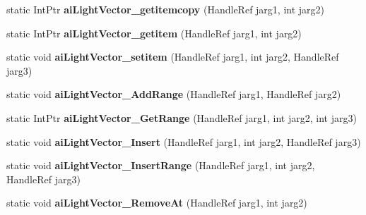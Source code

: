 \begin{DoxyCompactItemize}
\item 
\hypertarget{class_assimp_p_i_n_v_o_k_e_a712ce5cccd31b5d3c50c2599db1adf1e}{static Int\+Ptr {\bfseries ai\+Light\+Vector\+\_\+getitemcopy} (Handle\+Ref jarg1, int jarg2)}\label{class_assimp_p_i_n_v_o_k_e_a712ce5cccd31b5d3c50c2599db1adf1e}

\item 
\hypertarget{class_assimp_p_i_n_v_o_k_e_a07bbfd3e6caa5095f8828b1dbdc1b208}{static Int\+Ptr {\bfseries ai\+Light\+Vector\+\_\+getitem} (Handle\+Ref jarg1, int jarg2)}\label{class_assimp_p_i_n_v_o_k_e_a07bbfd3e6caa5095f8828b1dbdc1b208}

\item 
\hypertarget{class_assimp_p_i_n_v_o_k_e_a77287e956fca18e6c081a1ac3c7e6e4a}{static void {\bfseries ai\+Light\+Vector\+\_\+setitem} (Handle\+Ref jarg1, int jarg2, Handle\+Ref jarg3)}\label{class_assimp_p_i_n_v_o_k_e_a77287e956fca18e6c081a1ac3c7e6e4a}

\item 
\hypertarget{class_assimp_p_i_n_v_o_k_e_afe368bec4f049a3ecdf445e727af217b}{static void {\bfseries ai\+Light\+Vector\+\_\+\+Add\+Range} (Handle\+Ref jarg1, Handle\+Ref jarg2)}\label{class_assimp_p_i_n_v_o_k_e_afe368bec4f049a3ecdf445e727af217b}

\item 
\hypertarget{class_assimp_p_i_n_v_o_k_e_a38005de5fc0ebc0f4d65fc1d97d30333}{static Int\+Ptr {\bfseries ai\+Light\+Vector\+\_\+\+Get\+Range} (Handle\+Ref jarg1, int jarg2, int jarg3)}\label{class_assimp_p_i_n_v_o_k_e_a38005de5fc0ebc0f4d65fc1d97d30333}

\item 
\hypertarget{class_assimp_p_i_n_v_o_k_e_adb362f460c14358f6ed198147b0cbaa1}{static void {\bfseries ai\+Light\+Vector\+\_\+\+Insert} (Handle\+Ref jarg1, int jarg2, Handle\+Ref jarg3)}\label{class_assimp_p_i_n_v_o_k_e_adb362f460c14358f6ed198147b0cbaa1}

\item 
\hypertarget{class_assimp_p_i_n_v_o_k_e_abdf1a4fe2ade3afbbd73ed0288bcab62}{static void {\bfseries ai\+Light\+Vector\+\_\+\+Insert\+Range} (Handle\+Ref jarg1, int jarg2, Handle\+Ref jarg3)}\label{class_assimp_p_i_n_v_o_k_e_abdf1a4fe2ade3afbbd73ed0288bcab62}

\item 
\hypertarget{class_assimp_p_i_n_v_o_k_e_a6bc00625584577323f355e685d4fbfde}{static void {\bfseries ai\+Light\+Vector\+\_\+\+Remove\+At} (Handle\+Ref jarg1, int jarg2)}\label{class_assimp_p_i_n_v_o_k_e_a6bc00625584577323f355e685d4fbfde}


\end{DoxyCompactItemize}

